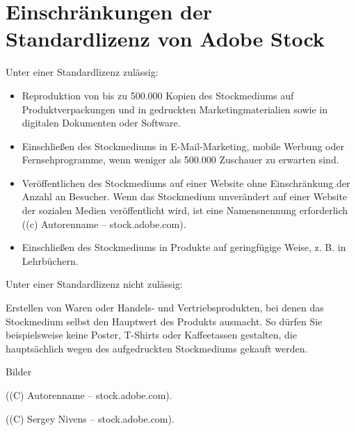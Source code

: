 

\section{Einschränkungen der Standardlizenz von Adobe
Stock}\label{einschraenkungen-der-standardlizenz-von-adobe-stock}

Unter einer Standardlizenz zulässig:

\begin{itemize}%
\item
  Reproduktion von bis zu 500.000 Kopien des Stockmediums auf
  Produktverpackungen und in gedruckten Marketingmaterialien sowie in
  digitalen Dokumenten oder Software.
\item
  Einschließen des Stockmediums in E-Mail-Marketing, mobile Werbung oder
  Fernsehprogramme, wenn weniger als 500.000 Zuschauer zu erwarten sind.
\item
  Veröffentlichen des Stockmediums auf einer Website ohne Einschränkung
  der Anzahl an Besucher. Wenn das Stockmedium unverändert auf einer
  Website der sozialen Medien veröffentlicht wird, ist eine
  Namensnennung erforderlich ((c) Autorenname -- stock.adobe.com).
\item
  Einschließen des Stockmediums in Produkte auf geringfügige Weise, z.
  B. in Lehrbüchern.
\end{itemize}

Unter einer Standardlizenz nicht zulässig:

Erstellen von Waren oder Handels- und Vertriebsprodukten, bei denen das
Stockmedium selbst den Hauptwert des Produkts ausmacht. So dürfen Sie
beispielsweise keine Poster, T-Shirts oder Kaffeetassen gestalten, die
hauptsächlich wegen des aufgedruckten Stockmediums gekauft werden.

Bilder

((C) Autorenname -- stock.adobe.com).

((C) Sergey Nivens -- stock.adobe.com).
